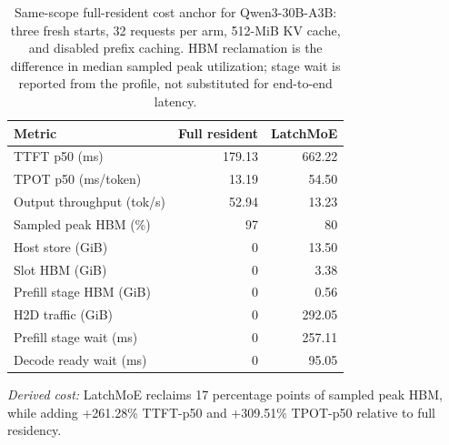 \begin{table}[t]
  \centering
  \small
  \caption{Same-scope full-resident cost anchor for Qwen3-30B-A3B: three fresh starts, 32 requests per arm, 512-MiB KV cache, and disabled prefix caching. HBM reclamation is the difference in median sampled peak utilization; stage wait is reported from the profile, not substituted for end-to-end latency.}
  \label{tab:cost-anchor}
  \begin{tabular}{lrr}
    \toprule
    Metric & Full resident & LatchMoE \\
    \midrule
    TTFT p50 (ms) & 179.13 & 662.22 \\
    TPOT p50 (ms/token) & 13.19 & 54.50 \\
    Output throughput (tok/s) & 52.94 & 13.23 \\
    Sampled peak HBM (\%) & 97 & 80 \\
    Host store (GiB) & 0 & 13.50 \\
    Slot HBM (GiB) & 0 & 3.38 \\
    Prefill stage HBM (GiB) & 0 & 0.56 \\
    H2D traffic (GiB) & 0 & 292.05 \\
    Prefill stage wait (ms) & 0 & 257.11 \\
    Decode ready wait (ms) & 0 & 95.05 \\
    \bottomrule
  \end{tabular}
  \vspace{2pt}
  \parbox{0.94\linewidth}{\footnotesize\emph{Derived cost:} LatchMoE reclaims 17 percentage points of sampled peak HBM, while adding +261.28\% TTFT-p50 and +309.51\% TPOT-p50 relative to full residency.}
\end{table}
